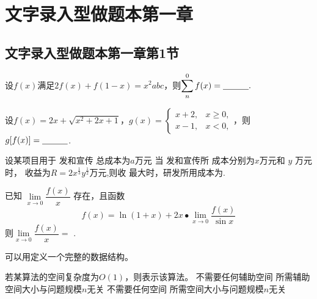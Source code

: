 \documentclass[standard]{ExBook}
\begin{document}


\maketitle 
 
 



\setcounter{page}{1}
\tableofcontents 
    
\clearpage 

\section{文字录入型做题本第一章}
\subsection{文字录入型做题本第一章第1节}

\begin{qitems}

    \begin{bbox}
        \qitem 设$f(x)$满足$2f(x)+f(1-x)=x^2 abc$，则$ \displaystyle\sum \limits_{n}^{0}f(x)=\underline{\hspace{3em}}.$
    \end{bbox}

    \begin{bbox}
        \qitem   设$f(x)=2x+\sqrt{x^{2}+2x+1}$，$g(x)=
        \begin{cases}
        x+2, & x\geqslant0, \\
        x-1, & x<0,  
        \end{cases}$，则$g[f(x)]= \underline{\hspace{3em}}$.
    \end{bbox}

    \begin{bbox}
        \qitem   设某项目用于 发和宣传 总成本为$a$万元 当 发和宣传所 成本分别为$x$万元和 $y$ 万元时， 收益为$R=2x^{\frac{1}{3}}y^{\frac{1}{2}}$万元,则收 最大时，研发所用成本为\blankline.
    \end{bbox}

    \begin{bbox}
        \qitem   已知 $\lim\limits_{x\to0}\dfrac{f(x)}{x}$ 存在，且函数
        $$f(x)=\ln(1+x)+2x\bullet\lim_{x\to0}\frac{f(x)}{\sin x}$$
        则$\lim\limits_{x\to0}\dfrac{f(x)}{x}=$ \blankline.
    \end{bbox}

    \begin{bbox}
        \qitem  可以用\blankbox 定义一个完整的数据结构。\textwater
    \end{bbox}

    \begin{bbox}
        \qitem   若某算法的空间复杂度为$O(1)$，则表示该算法\blankbox 。
        \fourchoices
        {不需要任何辅助空间}
        {所需辅助空间大小与问题规模$n$无关}
        {不需要任何空间}
        {所需空间大小与问题规模$n$无关}
    \end{bbox}
\end{qitems}
\end{document}
